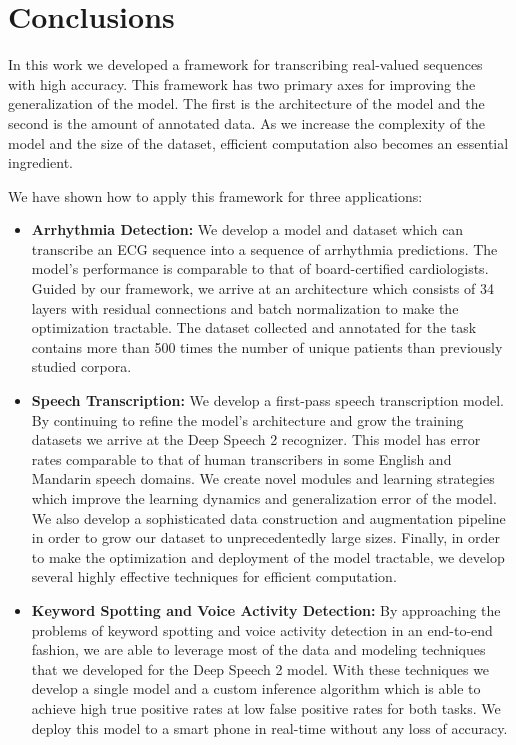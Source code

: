 \chapter{Conclusions}

In this work we developed a framework for transcribing real-valued sequences
with high accuracy. This framework has two primary axes for improving the
generalization of the model. The first is the architecture of the model and the
second is the amount of annotated data. As we increase the complexity of the
model and the size of the dataset, efficient computation also becomes an
essential ingredient.

We have shown how to apply this framework for three applications:
\begin{itemize}
    \setlength{\itemindent}{-1.5em}
    \item[]{\bf Arrhythmia Detection:} We develop a model and dataset which can
        transcribe an ECG sequence into a sequence of arrhythmia predictions.
        The model's performance is comparable to that of board-certified
        cardiologists.  Guided by our framework, we arrive at an architecture
        which consists of 34 layers with residual connections and batch
        normalization to make the optimization tractable.  The dataset
        collected and annotated for the task contains more than 500 times the
        number of unique patients than previously studied corpora.

    \item[]{\bf Speech Transcription:} We develop a first-pass speech
        transcription model. By continuing to refine the model's architecture
        and grow the training datasets we arrive at the Deep Speech 2
        recognizer. This model has error rates comparable to that of human
        transcribers in some English and Mandarin speech domains. We create
        novel modules and learning strategies which improve the learning
        dynamics and generalization error of the model. We also develop
        a sophisticated data construction and augmentation pipeline in order to
        grow our dataset to unprecedentedly large sizes. Finally, in order to
        make the optimization and deployment of the model tractable, we develop
        several highly effective techniques for efficient computation.

    \item[]{\bf Keyword Spotting and Voice Activity Detection:} By approaching
        the problems of keyword spotting and voice activity detection in an
        end-to-end fashion, we are able to leverage most of the data and
        modeling techniques that we developed for the Deep Speech 2 model. With
        these techniques we develop a single model and a custom inference
        algorithm which is able to achieve high true positive rates at low false
        positive rates for both tasks. We deploy this model to a smart phone in
        real-time without any loss of accuracy.

\end{itemize}

